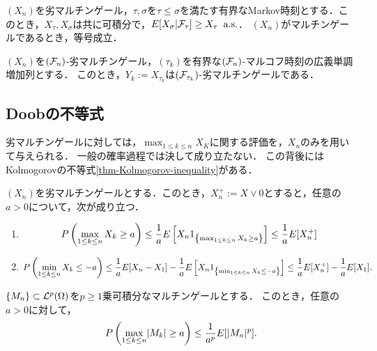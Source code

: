 \documentclass[uplatex,dvipdfmx]{jsreport}
\begin{document}
\begin{theorem}[有界停止時刻によるマルチンゲール性の保存]
    $(X_n)$を劣マルチンゲール，$\tau,\sigma$を$\tau\le\sigma$を満たす有界なMarkov時刻とする．このとき，$X_\tau,X_\sigma$は共に可積分で，$E[X_\sigma|\mathcal{F}_\tau]\ge X_\tau\;\;\mathrm{a.s.}$．
    $(X_n)$がマルチンゲールであるとき，等号成立．
\end{theorem}

\begin{corollary}
    $(X_n)$を$(\mathcal{F}_n)$-劣マルチンゲール，$(\tau_k)$を有界な$(\mathcal{F}_n)$-マルコフ時刻の広義単調増加列とする．
    このとき，$Y_k:=X_{\tau_k}$は$(\mathcal{F}_{\tau_k})$-劣マルチンゲールである．
\end{corollary}

\subsection{Doobの不等式}

\begin{tcolorbox}[colframe=ForestGreen, colback=ForestGreen!10!white,breakable,colbacktitle=ForestGreen!40!white,coltitle=black,fonttitle=\bfseries\sffamily,
title=]
    劣マルチンゲールに対しては，$\max_{1\le k\le n}X_K$に関する評価を，$X_n$のみを用いて与えられる．
    一般の確率過程では決して成り立たない．
    この背後にはKolmogorovの不等式\ref{thm-Kolmogorov-inequality}がある．
\end{tcolorbox}

\begin{theorem}\label{thm-Doob-inequality}
    $(X_n)$を劣マルチンゲールとする．このとき，$X_n^+:=X\lor0$とすると，任意の$a>0$について，次が成り立つ．
    \begin{enumerate}
        \item \[P\left(\max_{1\le k\le n}X_k\ge a\right)\le\frac{1}{a}E\left[X_n1_{\left\{\max_{1\le k\le n}X_k\ge a\right\}}\right]\le\frac{1}{a}E[X_n^+]\]
        \item \[P\left(\min_{1\le k\le n}X_k\le -a\right)\le\frac{1}{a}E[X_n-X_1]-\frac{1}{a}E\left[X_n1_{\left\{\min_{1\le k\le n}X_k\le -a\right\}}\right]\le\frac{1}{a}E[X_n^+]-\frac{1}{a}E[X_1].\]
    \end{enumerate}
\end{theorem}

\begin{corollary}
    $\{M_n\}\subset\mathcal{L}^p(\Omega)$を$p\ge1$乗可積分なマルチンゲールとする．
    このとき，任意の$a>0$に対して，
    \[P\left(\max_{1\le k\le n}\lvert M_k\rvert\ge a\right)\le\frac{1}{a^p}E[\lvert M_n\rvert^p].\]
\end{corollary}
\end{document}
